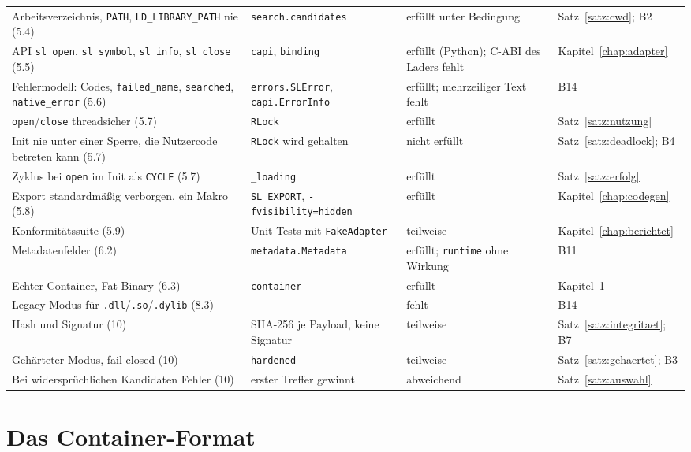 {\begin{longtable}{@{}L{4.1cm}L{4.5cm}L{2.2cm}L{3.6cm}@{}}
Arbeitsverzeichnis, \texttt{PATH}, \texttt{LD\_LIBRARY\_PATH} nie (5.4) & \texttt{search.candidates} & erfüllt unter Bedingung & Satz~\ref{satz:cwd}; B2 \\[0.3em]
API \texttt{sl\_open}, \texttt{sl\_symbol}, \texttt{sl\_info}, \texttt{sl\_close} (5.5) & \texttt{capi}, \texttt{binding} & erfüllt (Python); C-ABI des Laders fehlt & Kapitel~\ref{chap:adapter} \\[0.3em]
Fehlermodell: Codes, \texttt{failed\_name}, \texttt{searched}, \texttt{native\_error} (5.6) & \texttt{errors.SLError}, \texttt{capi.ErrorInfo} & erfüllt; mehrzeiliger Text fehlt & B14 \\[0.3em]
\texttt{open}/\texttt{close} threadsicher (5.7) & \texttt{RLock} & erfüllt & Satz~\ref{satz:nutzung} \\[0.3em]
Init nie unter einer Sperre, die Nutzercode betreten kann (5.7) & \texttt{RLock} wird gehalten & nicht erfüllt & Satz~\ref{satz:deadlock}; B4 \\[0.3em]
Zyklus bei \texttt{open} im Init als \texttt{CYCLE} (5.7) & \texttt{\_loading} & erfüllt & Satz~\ref{satz:erfolg} \\[0.3em]
Export standardmäßig verborgen, ein Makro (5.8) & \texttt{SL\_EXPORT}, \texttt{-fvisibility=hidden} & erfüllt & Kapitel~\ref{chap:codegen} \\[0.3em]
Konformitätssuite (5.9) & Unit-Tests mit \texttt{FakeAdapter} & teilweise & Kapitel~\ref{chap:berichtet} \\[0.3em]
Metadatenfelder (6.2) & \texttt{metadata.Metadata} & erfüllt; \texttt{runtime} ohne Wirkung & B11 \\[0.3em]
Echter Container, Fat-Binary (6.3) & \texttt{container} & erfüllt & Kapitel~\ref{chap:container} \\[0.3em]
Legacy-Modus für \texttt{.dll}/\texttt{.so}/\texttt{.dylib} (8.3) & -- & fehlt & B14 \\[0.3em]
Hash und Signatur (10) & SHA-256 je Payload, keine Signatur & teilweise & Satz~\ref{satz:integritaet}; B7 \\[0.3em]
Gehärteter Modus, fail closed (10) & \texttt{hardened} & teilweise & Satz~\ref{satz:gehaertet}; B3 \\[0.3em]
Bei widersprüchlichen Kandidaten Fehler (10) & erster Treffer gewinnt & abweichend & Satz~\ref{satz:auswahl} \\
\end{longtable}
}

\chapter{Das Container-Format}
\label{chap:container}

